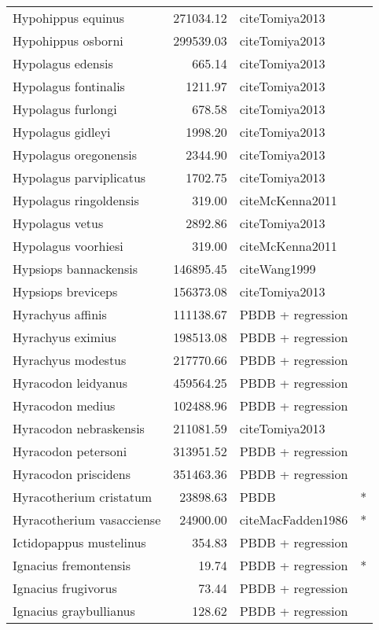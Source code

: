 \begin{table}[ht]
\begin{tabular}{lrll}
  Hypohippus equinus & 271034.12 & cite{Tomiya2013} &  \\ 
  Hypohippus osborni & 299539.03 & cite{Tomiya2013} &  \\ 
  Hypolagus edensis & 665.14 & cite{Tomiya2013} &  \\ 
  Hypolagus fontinalis & 1211.97 & cite{Tomiya2013} &  \\ 
  Hypolagus furlongi & 678.58 & cite{Tomiya2013} &  \\ 
  Hypolagus gidleyi & 1998.20 & cite{Tomiya2013} &  \\ 
  Hypolagus oregonensis & 2344.90 & cite{Tomiya2013} &  \\ 
  Hypolagus parviplicatus & 1702.75 & cite{Tomiya2013} &  \\ 
  Hypolagus ringoldensis & 319.00 & cite{McKenna2011} &  \\ 
  Hypolagus vetus & 2892.86 & cite{Tomiya2013} &  \\ 
  Hypolagus voorhiesi & 319.00 & cite{McKenna2011} &  \\ 
  Hypsiops bannackensis & 146895.45 & cite{Wang1999} &  \\ 
  Hypsiops breviceps & 156373.08 & cite{Tomiya2013} &  \\ 
  Hyrachyus affinis & 111138.67 & PBDB + regression &  \\ 
  Hyrachyus eximius & 198513.08 & PBDB + regression &  \\ 
  Hyrachyus modestus & 217770.66 & PBDB + regression &  \\ 
  Hyracodon leidyanus & 459564.25 & PBDB + regression &  \\ 
  Hyracodon medius & 102488.96 & PBDB + regression &  \\ 
  Hyracodon nebraskensis & 211081.59 & cite{Tomiya2013} &  \\ 
  Hyracodon petersoni & 313951.52 & PBDB + regression &  \\ 
  Hyracodon priscidens & 351463.36 & PBDB + regression &  \\ 
  Hyracotherium cristatum & 23898.63 & PBDB & * \\ 
  Hyracotherium vasacciense & 24900.00 & cite{MacFadden1986} & * \\ 
  Ictidopappus mustelinus & 354.83 & PBDB + regression &  \\ 
  Ignacius fremontensis & 19.74 & PBDB + regression & * \\ 
  Ignacius frugivorus & 73.44 & PBDB + regression &  \\ 
  Ignacius graybullianus & 128.62 & PBDB + regression &  \\ 

\end{tabular}
\end{table}
